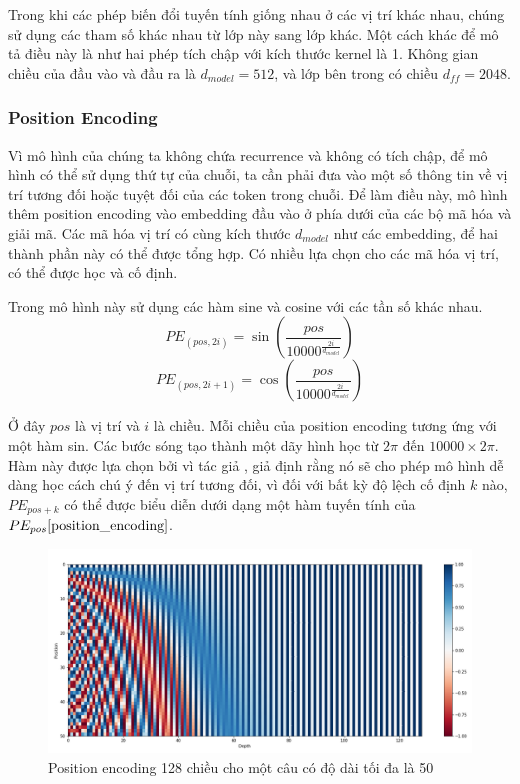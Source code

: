 Trong khi các phép biến đổi tuyến tính giống nhau ở các vị trí khác nhau, chúng sử dụng các tham số khác nhau từ lớp này sang lớp khác. Một cách khác để mô tả điều này là như hai phép tích chập với kích thước kernel là 1. Không gian chiều của đầu vào và đầu ra là $d_{model} = 512$, và lớp bên trong có chiều $d_{ff} = 2048$.

\subsubsection*{Position Encoding}
Vì mô hình của chúng ta không chứa recurrence và không có tích chập, để mô hình có thể sử dụng thứ tự của chuỗi, ta cần phải đưa vào một số thông tin về vị trí tương đối hoặc tuyệt đối của các token trong chuỗi. Để làm điều này, mô hình thêm position encoding vào embedding đầu vào ở phía dưới của các bộ mã hóa và giải mã. Các mã hóa vị trí có cùng kích thước $d_{model}$ như các embedding, để hai thành phần này có thể được tổng hợp. Có nhiều lựa chọn cho các mã hóa vị trí, có thể được học và cố định.

Trong mô hình này sử dụng các hàm sine và cosine với các tần số khác nhau.
\[
    PE_{(pos, 2i)} = \sin(\frac{pos}{10000^{\frac{2i}{d_{model}}}})    
\]
\[
    PE_{(pos, 2i+1)} = \cos(\frac{pos}{10000^{\frac{2i}{d_{model}}}})    
\]

Ở đây $pos$ là vị trí và $i$ là chiều. Mỗi chiều của position encoding tương ứng với một hàm sin. Các bước sóng tạo thành một dãy hình học từ $2\pi$ đến $10000 \times 2\pi$. Hàm này được lựa chọn bởi vì tác giả \cite{vaswani2023attention}, giả định rằng nó sẽ cho phép mô hình dễ dàng học cách chú ý đến vị trí tương đối, vì đối với bất kỳ độ lệch cố định $k$ nào, $PE_{pos+k}$ có thể được biểu diễn dưới dạng một hàm tuyến tính của $PE_{pos} \ref{position_encoding}$.
\begin{figure}[h]
    \includegraphics[scale=0.40]{images/positional_encoding.png}
    \centering
    \caption{Position encoding 128 chiều cho một câu có độ dài tối đa là 50}
    \label{position_encoding}
\end{figure}
